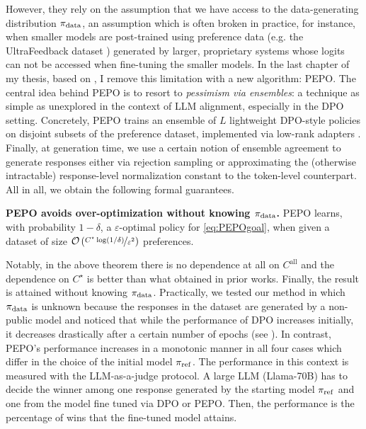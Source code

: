 \documentclass{article}
\begin{document}
However, they rely on the assumption that we have access to the data-generating distribution $\pi_{\mathrm{data}}$, an assumption 
which is often broken in practice, for instance, when smaller models are post-trained 
using preference data (e.g.  the UltraFeedback dataset  \citep{cui2023ultrafeedback} ) generated by larger, proprietary systems 
whose logits can not be accessed when fine-tuning the smaller models. 
In the last chapter of my thesis, based on , I remove this limitation with a new algorithm: PEPO.
The central idea behind PEPO is to resort to \emph{pessimism via ensembles}: a technique as simple as unexplored in the context of LLM alignment, especially in the DPO setting.
Concretely, PEPO trains an ensemble of $L$ lightweight DPO-style policies on disjoint subsets of the preference dataset, implemented via low-rank adapters \citep{hu2022lora}. Finally, at generation time, we use a certain notion of ensemble agreement to generate responses either via rejection sampling or approximating the (otherwise intractable) response-level normalization constant to the token-level counterpart.
All in all, we obtain the following formal guarantees.
\begin{tcolorbox}[
    colback=orange!10!white,
    colframe=orange!80!black,
    width=\linewidth
  ]
\begin{theorem} \textbf{PEPO avoids over-optimization without knowing $\pi_{\mathrm{data}}$.}
PEPO learns, with probability $1-\delta$, a $\varepsilon$-optimal policy for \eqref{eq:PEPOgoal}, when given a dataset of size $\mathcal{O}\left({\nicefrac{C^\star \log(1/\delta)}{\varepsilon^2}}\right)$ preferences.
\end{theorem}
\end{tcolorbox}
Notably, in the above theorem there is no dependence at all on $C^{\mathrm{all}}$ and the dependence on $C^\star$ is better than what obtained in prior works. 
Finally, the result is attained without knowing $\pi_{\mathrm{data}}$.
Practically, we tested our method in which $\pi_{\mathrm{data}}$ is unknown because the responses 
in the dataset are generated by
a non-public model and noticed that while the performance of DPO increases initially,
 it decreases drastically after a certain number of epochs (see ). In contrast, PEPO's performance increases in a monotonic manner 
 in all four cases which differ in the choice of the initial model $\pi_{\mathrm{ref}}$.
The performance in this context is measured with the LLM-as-a-judge protocol.
A large LLM (Llama-70B) has to decide the winner among one response generated by the starting model $\pi_{\mathrm{ref}}$
and one from the model fine tuned via DPO or PEPO. Then, the performance is the percentage of wins that the fine-tuned model attains.
\end{document}
